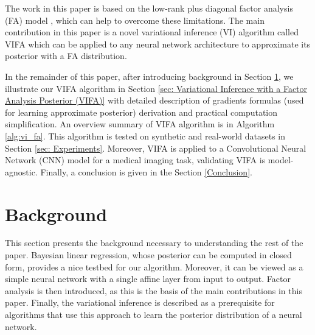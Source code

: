 \documentclass[10pt]{article} %
\begin{document}
The work in this paper is based on the low-rank plus diagonal factor analysis (FA) model \citep{barber2007}, which can help to overcome these limitations. The main contribution in this paper is a novel variational inference (VI) algorithm called VIFA which can be applied to any neural network architecture to approximate its posterior with a FA distribution. 

In the remainder of this paper, after introducing background in Section \ref{sec:background}, we illustrate our VIFA algorithm in Section \ref{sec: Variational Inference with a Factor Analysis Posterior (VIFA)} with detailed description of gradients formulas (used for learning approximate posterior) derivation and practical computation simplification. An overview summary of VIFA algorithm is in Algorithm \ref{alg:vi_fa}. This algorithm is tested on synthetic and real-world datasets in Section \ref{sec: Experiments}. Moreover, VIFA is applied to a Convolutional Neural Network (CNN) model for a medical imaging task, validating  VIFA is model-agnostic. Finally, a conclusion is given in the Section \ref{Conclusion}.


\section{Background}
\label{sec:background}
This section presents the background necessary to understanding the rest of the paper. Bayesian linear regression, whose posterior can be computed in closed form, provides a nice testbed for our algorithm. Moreover, it can be viewed as a simple neural network with a single affine layer from input to output. Factor analysis is then introduced, as this is the basis of the main contributions in this paper. Finally, the variational inference is described as a prerequisite for algorithms that use this approach to learn the posterior distribution of a neural network.
\end{document}
